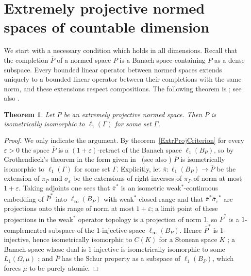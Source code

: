 \documentclass[12pt]{article}
\newtheorem{theorem}{Theorem}[section]
\newcommand{\ellone}[1]{\ell_1(#1)}
\begin{document}

\section{Extremely projective normed spaces of countable
  dimension}\label{SectionMainTheorem}

We start with a necessary condition which holds in all dimensions. Recall that
the completion $\overline{P}$ of a normed space $P$ is a Banach space containing
$P$ as a dense subspace. Every bounded linear operator between normed spaces
extends uniquely to a bounded linear operator between their completions with
the same norm, and these extensions respect compositions. The following
theorem is \cite[proposition 2.3]{HelExtrProjSeqAlg}; see also
\cite[section 3]{GronLiftProbNormSp}.

\begin{theorem}\label{CompletionIsEllOne} Let $P$ be an extremely projective
    normed space. Then $\overline{P}$ is isometrically isomorphic to
    $\ellone{\Gamma}$ for some set $\Gamma$.
\end{theorem}
\begin{proof} We only indicate the argument. By theorem~\ref{ExtrProjCriterion}
    for every $\varepsilon>0$ the space $\overline{P}$ is a
    $(1+\varepsilon)$-retract of the Banach space $\ellone{B_P}$, so by
    Grothendieck's theorem \cite{GrothMetrProjFlatBanSp} in the form given
    in~\cite[section 2]{HelExtrProjSeqAlg} (see also \cite[proposition 3.2]{HelMetrFrQMod})
    $\overline{P}$ is isometrically isomorphic to $\ellone{\Gamma}$ for some
    set $\Gamma$. Explicitly, let $\overline{\pi}:\ellone{B_P}\to\overline{P}$
    be the extension of $\pi_P$ and $\overline{\sigma}_\varepsilon$ be the
    extensions of right inverses of $\pi_P$ of norm at most $1+\varepsilon$.
    Taking adjoints one sees that ${\overline{\pi}}^*$ is an isometric
    weak$^*$-continuous embedding of ${\overline{P}}^*$ into
    $\ell_\infty(B_P)$ with weak$^*$-closed range and that
    ${\overline{\pi}}^*{\overline{\sigma}_\varepsilon}^*$ are projections onto
    this range of norm at most $1+\varepsilon$; a limit point of these
    projections in the weak$^*$ operator topology is a projection of norm
    $1$, so ${\overline{P}}^*$ is a $1$-complemented subspace of the
    $1$-injective space $\ell_\infty(B_P)$. Hence ${\overline{P}}^*$ is
    $1$-injective, hence isometrically isomorphic to $C(K)$ for a Stonean
    space $K$ \cite[chapter 3, \S 11, theorem 6]{LaceyIsomThOfClassicBanSp}; a Banach space
    whose dual is $1$-injective is isometrically isomorphic to some
    $L_1(\Omega,\mu)$ \cite[chapter 7]{LaceyIsomThOfClassicBanSp}; and
    $\overline{P}$ has the Schur property as a subspace of
    $\ellone{B_P}$, which forces $\mu$ to be purely atomic.
\end{proof}
\end{document}
